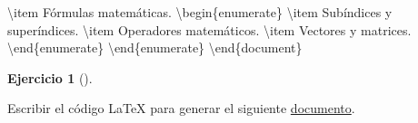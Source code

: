 \documentclass[
  a4paper,
]{scrreport}
\newenvironment{Shaded}{\begin{snugshade}}{\end{snugshade}}
\newcommand{\ExtensionTok}[1]{\textcolor[rgb]{0.00,0.23,0.31}{#1}}
\newcommand{\FunctionTok}[1]{\textcolor[rgb]{0.28,0.35,0.67}{#1}}
\newcommand{\KeywordTok}[1]{\textcolor[rgb]{0.00,0.23,0.31}{#1}}
\newcommand{\NormalTok}[1]{\textcolor[rgb]{0.00,0.23,0.31}{#1}}
\theoremstyle{definition}
\newtheorem{exercise}{Ejercicio}[chapter]
\theoremstyle{remark}
\begin{document}
\begin{tcolorbox}
\begin{Shaded}
\begin{Highlighting}[]
  \FunctionTok{\textbackslash{}item}\NormalTok{ Fórmulas matemáticas.}
  \KeywordTok{\textbackslash{}begin}\NormalTok{\{}\ExtensionTok{enumerate}\NormalTok{\}}
    \FunctionTok{\textbackslash{}item}\NormalTok{ Subíndices y superíndices.}
    \FunctionTok{\textbackslash{}item}\NormalTok{ Operadores matemáticos.}
    \FunctionTok{\textbackslash{}item}\NormalTok{ Vectores y matrices.}
  \KeywordTok{\textbackslash{}end}\NormalTok{\{}\ExtensionTok{enumerate}\NormalTok{\}}
\KeywordTok{\textbackslash{}end}\NormalTok{\{}\ExtensionTok{enumerate}\NormalTok{\}}
\KeywordTok{\textbackslash{}end}\NormalTok{\{}\ExtensionTok{document}\NormalTok{\}}
\end{Highlighting}
\end{Shaded}

\end{tcolorbox}

\begin{exercise}[]\protect\hypertarget{exr-tablas-horario}{}\label{exr-tablas-horario}

Escribir el código LaTeX para generar el siguiente
\href{doc/ejercicio4.pdf}{documento}.

\begin{tcolorbox}[enhanced jigsaw, left=2mm, colbacktitle=quarto-callout-note-color!10!white, toprule=.15mm, coltitle=black, leftrule=.75mm, arc=.35mm, colback=white, opacitybacktitle=0.6, rightrule=.15mm, colframe=quarto-callout-note-color-frame, title=\textcolor{quarto-callout-note-color}{\faInfo}\hspace{0.5em}{Ver documento}, bottomrule=.15mm, breakable, opacityback=0, bottomtitle=1mm, toptitle=1mm, titlerule=0mm]

\end{tcolorbox}

\end{exercise}
\end{document}
